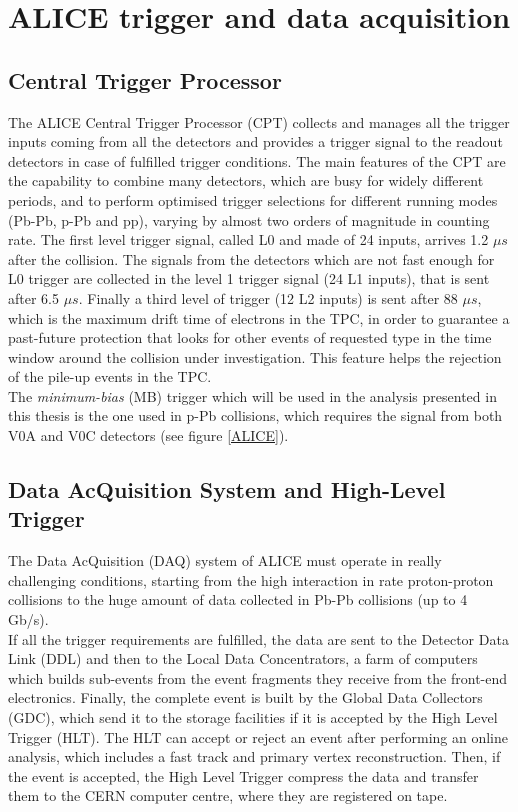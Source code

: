 \documentclass[b5paper,10pt,twoside,oldstyle,classica]{toptesi}
\begin{document}
\section{ALICE trigger and data acquisition}
\subsection{Central Trigger Processor}
\label{MBtrigger_sec}
The ALICE Central Trigger Processor (CPT) \cite{ALICEtrigger} collects and manages all the trigger inputs coming from all the detectors and provides a trigger signal to the readout detectors in case of fulfilled trigger conditions. The main features of the CPT are the capability to combine many detectors, which are busy for widely different periods, and to perform optimised trigger selections for different running modes (Pb-Pb, p-Pb and pp), varying by almost two orders of magnitude in counting rate. The first level trigger signal, called L0 and made of 24 inputs, arrives 1.2 $\mu s$ after the collision. The signals from the detectors which are not fast enough for L0 trigger are collected in the level 1 trigger signal (24 L1 inputs), that is sent after 6.5 $\mu s$. Finally a third level of trigger (12 L2 inputs) is sent after 88 $\mu s$, which is the maximum drift time of electrons in the TPC, in order to guarantee a past-future protection that looks for other events of requested type in the time window around the collision under investigation. This feature helps the rejection of the pile-up events in the TPC.\\
The \textit{minimum-bias} (MB) trigger which will be used in the analysis presented in this thesis is the one used in p-Pb collisions, which requires the signal from both V0A and V0C detectors (see figure \ref{ALICE}).
\subsection{Data AcQuisition System and High-Level Trigger}
The Data AcQuisition (DAQ) system of ALICE must operate in really challenging conditions, starting from the high interaction in rate proton-proton collisions to the huge amount of data collected in Pb-Pb collisions (up to 4 Gb/s).\\
If all the trigger requirements are fulfilled, the data are sent to the Detector Data Link (DDL) and then to the Local Data Concentrators, a farm of computers which builds sub-events from the event fragments they receive from the front-end electronics. Finally, the complete event is built by the Global Data Collectors (GDC), which send it to the storage facilities if it is accepted by the High Level Trigger (HLT). The HLT can accept or reject an event after performing an online analysis, which includes a fast track and primary vertex reconstruction. Then, if the event is accepted, the High Level Trigger compress the data and transfer them to the CERN computer centre, where they are registered on tape.      
\end{document}
